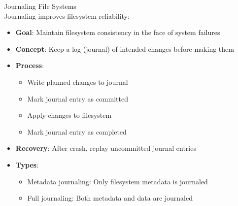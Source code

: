 \begin{definition}{Journaling File Systems}\\
    Journaling improves filesystem reliability:
    \begin{itemize}
        \item \textbf{Goal}: Maintain filesystem consistency in the face of system failures
        \item \textbf{Concept}: Keep a log (journal) of intended changes before making them
        \item \textbf{Process}:
            \begin{itemize}
                \item Write planned changes to journal
                \item Mark journal entry as committed
                \item Apply changes to filesystem
                \item Mark journal entry as completed
            \end{itemize}
        \item \textbf{Recovery}: After crash, replay uncommitted journal entries
        \item \textbf{Types}:
            \begin{itemize}
                \item Metadata journaling: Only filesystem metadata is journaled
                \item Full journaling: Both metadata and data are journaled
            \end{itemize}
    \end{itemize}
\end{definition}

